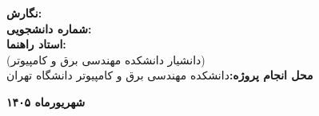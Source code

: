 \begin{titlepage}
\begin{center}
    \begin{minipage}{0.85\textwidth}
        \large
        \textbf{نگارش:}\\[0.3cm]
        \textbf{شماره دانشجویی:}\\[0.6cm]
        \textbf{استاد راهنما:}\\[0.2cm]
        \small (دانشیار دانشکده مهندسی برق و کامپیوتر)\\[0.6cm]
        \textbf{محل انجام پروژه:}\quad دانشکده مهندسی برق و کامپیوتر دانشگاه تهران
    \end{minipage}

    \vfill

    {\large\bfseries شهریورماه ۱۴۰۵}

\end{center}
\end{titlepage}
